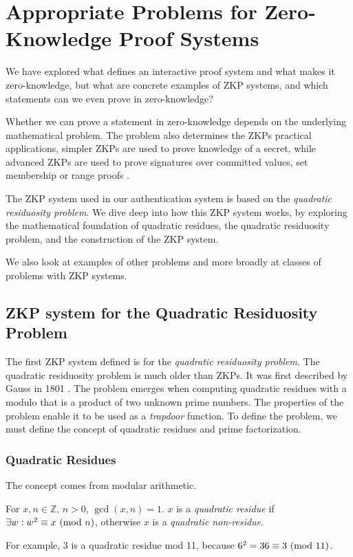 \section{Appropriate Problems for Zero-Knowledge \newline Proof Systems}
We have explored what defines an interactive proof system and what makes it zero-knowledge, but what are concrete examples of ZKP systems, and which statements can we even prove in zero-knowledge?

Whether we can prove a statement in zero-knowledge depends on the underlying mathematical problem.
The problem also determines the ZKPs practical applications, simpler ZKPs are used to prove knowledge of a secret, while advanced ZKPs are used to prove signatures over committed values, set membership or range proofs \cite{camenisch2008efficient, bunz2018bulletproofs, camenisch2001efficient, bowe2018multi}.

The ZKP system \cite{goldwasser1989knowledge} used in our authentication system is based on the \textit{quadratic residuosity problem}.
We dive deep into how this ZKP system works, by exploring the mathematical foundation of quadratic residues, the quadratic residuosity problem, and the construction of the ZKP system.

We also look at examples of other problems and more broadly at classes of problems with ZKP systems.

\subsection{ZKP system for the Quadratic Residuosity Problem}
\label{zkp-qrp}
The first ZKP system defined \cite{goldwasser1989knowledge} is for the \textit{quadratic residuosity problem}.
The quadratic residuosity problem is much older than ZKPs. It was first described by Gauss in 1801 \cite{10.2307/j.ctt1cc2mnd}.
The problem emerges when computing quadratic residues with a modulo that is a product of two unknown prime numbers.
The properties of the problem enable it to be used as a \textit{trapdoor} function. 
To define the problem, we must define the concept of quadratic residues and prime factorization.

\subsubsection{Quadratic Residues} 
The concept \cite{andrews1994number} comes from modular arithmetic.

\begin{definition}
	For $x, n \in \mathbb{Z}$, $n > 0$, $\gcd(x, n) = 1 $.
	$x$ is a \textit{quadratic residue} if  $\exists w:w^2 \equiv x \ (\mathrm{mod}\ n)$, otherwise $x$ is a \textit{quadratic non-residue}.
\end{definition}
\noindent For example,
$3$ is a quadratic residue mod 11, because $6^2 = 36 \equiv 3 \ (\mathrm{mod}\ 11)$.

